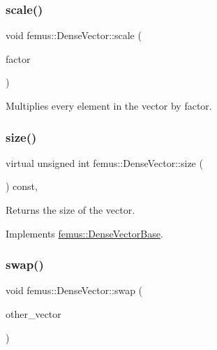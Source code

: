 \subsubsection{\texorpdfstring{scale()}{scale()}}
{\footnotesize\ttfamily void femus\+::\+Dense\+Vector\+::scale (\begin{DoxyParamCaption}\item[{const double}]{factor }\end{DoxyParamCaption})\hspace{0.3cm}{\ttfamily [inline]}}



Multiplies every element in the vector by {\ttfamily factor}. 

\mbox{\label{classfemus_1_1_dense_vector_ac7d42a76bf12cb82076b8c7444cbc9ee}} 
\subsubsection{\texorpdfstring{size()}{size()}}
{\footnotesize\ttfamily virtual unsigned int femus\+::\+Dense\+Vector\+::size (\begin{DoxyParamCaption}{ }\end{DoxyParamCaption}) const\hspace{0.3cm}{\ttfamily [inline]}, {\ttfamily [virtual]}}


\begin{DoxyItemize}
\item \begin{DoxyReturn}{Returns}
the size of the vector. 
\end{DoxyReturn}

\end{DoxyItemize}

Implements \mbox{\hyperlink{classfemus_1_1_dense_vector_base_a642849a48ad4800945952af17c1e30c9}{femus\+::\+Dense\+Vector\+Base}}.

\mbox{\label{classfemus_1_1_dense_vector_a95404c4c657691d8e4b719d08e7820c1}} 
\subsubsection{\texorpdfstring{swap()}{swap()}}
{\footnotesize\ttfamily void femus\+::\+Dense\+Vector\+::swap (\begin{DoxyParamCaption}\item[{\mbox{\hyperlink{classfemus_1_1_dense_vector}{Dense\+Vector}} \&}]{other\+\_\+vector }\end{DoxyParamCaption})\hspace{0.3cm}{\ttfamily [inline]}}


